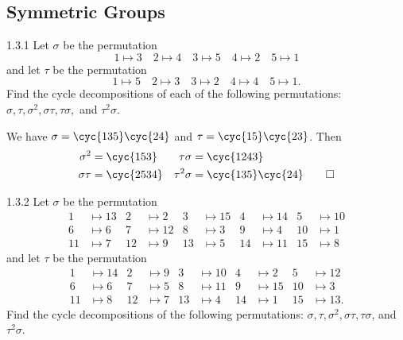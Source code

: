 \subsection{Symmetric Groups}

\begin{exercise}{1.3.1}
    Let $\sigma$ be the permutation
    \[
    	1 \mapsto 3 \quad 2 \mapsto 4 \quad 3 \mapsto 5 \quad 4 \mapsto 2 \quad 5 \mapsto 1
    \]
    and let $\tau$ be the permutation
    \[
    	1 \mapsto 5 \quad 2 \mapsto 3 \quad 3 \mapsto 2 \quad 4 \mapsto 4 \quad 5 \mapsto 1.
    \]
    Find the cycle decompositions of each of the following permutations:
    $\sigma, \tau, \sigma^2, \sigma\tau, \tau\sigma,$ and $\tau^2\sigma.$
\end{exercise}

\begin{sol}
    We have $\sigma = \cyc{1 3 5}\cyc{2 4}$ and $\tau = \cyc{1 5}\cyc{2 3}$.
    Then
    \begin{align*}
        \sigma^2 & = \cyc{1 5 3} & \tau\sigma & = \cyc{1 2 4 3} \\
        \sigma\tau & = \cyc{2 5 3 4} & \tau^2\sigma & = \cyc{1 3 5}\cyc{2 4} \qedhere
    \end{align*}
\end{sol}

\begin{exercise}{1.3.2} 
    Let $\sigma$ be the permutation
    \begin{align*}
        1 &\mapsto 13 & 2 &\mapsto 2 & 3 & \mapsto 15 & 4 & \mapsto 14 & 5 & \mapsto 10  \\
        6 &\mapsto 6 & 7 &\mapsto 12 & 8 & \mapsto 3 & 9 & \mapsto 4 & 10 & \mapsto 1 \\
        11 &\mapsto 7 & 12 &\mapsto 9 & 13 & \mapsto 5 & 14 & \mapsto 11 & 15 & \mapsto 8
    \end{align*}
    and let $\tau$ be the permutation
    \begin{align*}
        1 &\mapsto 14 & 2 &\mapsto 9 & 3 &\mapsto 10 & 4 &\mapsto 2 & 5 &\mapsto 12 \\
        6 &\mapsto 6 & 7 &\mapsto 5 & 8 &\mapsto 11 & 9 &\mapsto 15 & 10 &\mapsto 3 \\
        11 &\mapsto 8 & 12 &\mapsto 7 & 13 &\mapsto 4 & 14 &\mapsto 1 & 15 &\mapsto 13.
    \end{align*}
    Find the cycle decompositions of the following permutations: $\sigma, \tau, \sigma^2, \sigma\tau, \tau\sigma$, and $\tau^2\sigma.$
\end{exercise}

